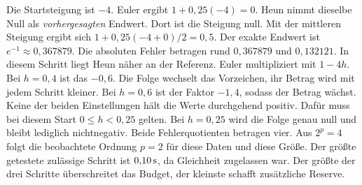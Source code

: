 \schreibfeld



Die Startsteigung ist \(-4\). Euler ergibt \(1+0{,}25(-4)=0\). Heun nimmt dieselbe Null als \emph{vorhergesagten} Endwert. Dort ist die Steigung null. Mit der mittleren Steigung ergibt sich \(1+0{,}25(-4+0)/2=0{,}5\). Der exakte Endwert ist \(e^{-1}\approx0{,}367879\). Die absoluten Fehler betragen rund \(0{,}367879\) und \(0{,}132121\). In diesem Schritt liegt Heun näher an der Referenz.
Euler multipliziert mit \(1-4h\). Bei \(h=0{,}4\) ist das \(-0{,}6\). Die Folge wechselt das Vorzeichen, ihr Betrag wird mit jedem Schritt kleiner. Bei \(h=0{,}6\) ist der Faktor \(-1{,}4\), sodass der Betrag wächst. Keine der beiden Einstellungen hält die Werte durchgehend positiv. Dafür muss bei diesem Start \(0\le h<0{,}25\) gelten. Bei \(h=0{,}25\) wird die Folge genau null und bleibt lediglich nichtnegativ.
Beide Fehlerquotienten betragen vier. Aus \(2^p=4\) folgt die beobachtete Ordnung \(p=2\) für diese Daten und diese Größe. Der größte getestete zulässige Schritt ist \(0{,}10\,\mathrm{s}\), da Gleichheit zugelassen war. Der größte der drei Schritte überschreitet das Budget, der kleinste schafft zusätzliche Reserve.


